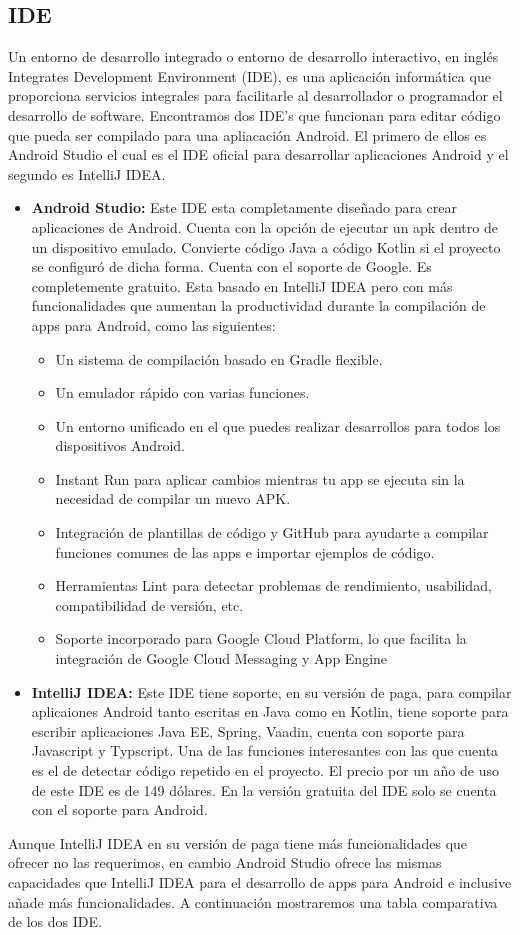 \subsection{IDE}
Un entorno de desarrollo integrado o entorno de desarrollo interactivo, en inglés Integrates Development Environment (IDE), es una aplicación informática que proporciona servicios integrales para facilitarle al desarrollador o programador el desarrollo de software. Encontramos dos IDE's que funcionan para editar código que pueda ser compilado para una apliacación Android. El primero de ellos es Android Studio el cual es el IDE oficial para desarrollar aplicaciones Android y el segundo es IntelliJ IDEA.
\begin{itemize}
	\item \textbf{Android Studio:} Este IDE esta completamente diseñado para crear aplicaciones de Android. Cuenta con la opción de ejecutar un apk dentro de un dispositivo emulado. Convierte código Java a código Kotlin si el proyecto se configuró de dicha forma. Cuenta con el soporte de Google. Es completemente gratuito. Esta basado en IntelliJ IDEA pero con más funcionalidades que aumentan la productividad durante la compilación de apps para Android, como las siguientes:
	\begin{itemize}
		\item Un sistema de compilación basado en Gradle flexible.
		\item Un emulador rápido con varias funciones.
		\item Un entorno unificado en el que puedes realizar desarrollos para todos los dispositivos Android.
		\item Instant Run para aplicar cambios mientras tu app se ejecuta sin la necesidad de compilar un nuevo APK.
		\item Integración de plantillas de código y GitHub para ayudarte a compilar funciones comunes de las apps e importar ejemplos de código.
		\item Herramientas Lint para detectar problemas de rendimiento, usabilidad, compatibilidad de versión, etc.
		\item Soporte incorporado para Google Cloud Platform, lo que facilita la integración de Google Cloud Messaging y App Engine
	\end{itemize}
	\item \textbf{IntelliJ IDEA: } Este IDE tiene soporte, en su versión de paga, para compilar aplicaiones Android tanto escritas en Java como en Kotlin, tiene soporte para escribir aplicaciones Java EE, Spring, Vaadin, cuenta con soporte para Javascript y Typscript. Una de las funciones interesantes con las que cuenta es el de detectar código repetido en el proyecto. El precio por un año de uso de este IDE es de 149 dólares. En la versión gratuita del IDE solo se cuenta con el soporte para  Android.
\end{itemize}
Aunque IntelliJ IDEA en su versión de paga tiene más funcionalidades que ofrecer no las requerimos, en cambio Android Studio ofrece las mismas capacidades que IntelliJ IDEA para el desarrollo de apps para Android e inclusive añade más funcionalidades. A continuación mostraremos una tabla comparativa de los dos IDE.

